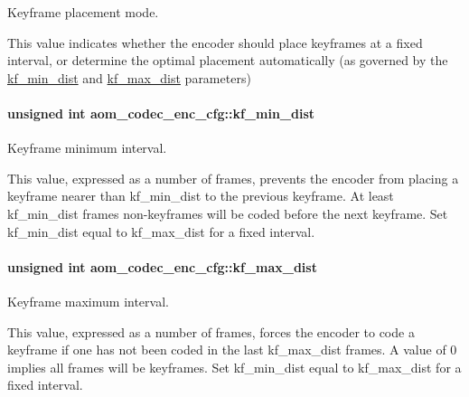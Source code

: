Keyframe placement mode. 

This value indicates whether the encoder should place keyframes at a fixed interval, or determine the optimal placement automatically (as governed by the \hyperlink{structaom__codec__enc__cfg_a5df0104b97c8ad18f8f1df492706a256}{kf\+\_\+min\+\_\+dist} and \hyperlink{structaom__codec__enc__cfg_a877936e8a60207e7eac223811af0c124}{kf\+\_\+max\+\_\+dist} parameters) 
\paragraph[{\texorpdfstring{kf\+\_\+min\+\_\+dist}{kf_min_dist}}]{\setlength{\rightskip}{0pt plus 5cm}unsigned int aom\+\_\+codec\+\_\+enc\+\_\+cfg\+::kf\+\_\+min\+\_\+dist}\hypertarget{structaom__codec__enc__cfg_a5df0104b97c8ad18f8f1df492706a256}{}\label{structaom__codec__enc__cfg_a5df0104b97c8ad18f8f1df492706a256}


Keyframe minimum interval. 

This value, expressed as a number of frames, prevents the encoder from placing a keyframe nearer than kf\+\_\+min\+\_\+dist to the previous keyframe. At least kf\+\_\+min\+\_\+dist frames non-\/keyframes will be coded before the next keyframe. Set kf\+\_\+min\+\_\+dist equal to kf\+\_\+max\+\_\+dist for a fixed interval. 
\paragraph[{\texorpdfstring{kf\+\_\+max\+\_\+dist}{kf_max_dist}}]{\setlength{\rightskip}{0pt plus 5cm}unsigned int aom\+\_\+codec\+\_\+enc\+\_\+cfg\+::kf\+\_\+max\+\_\+dist}\hypertarget{structaom__codec__enc__cfg_a877936e8a60207e7eac223811af0c124}{}\label{structaom__codec__enc__cfg_a877936e8a60207e7eac223811af0c124}


Keyframe maximum interval. 

This value, expressed as a number of frames, forces the encoder to code a keyframe if one has not been coded in the last kf\+\_\+max\+\_\+dist frames. A value of 0 implies all frames will be keyframes. Set kf\+\_\+min\+\_\+dist equal to kf\+\_\+max\+\_\+dist for a fixed interval. 
